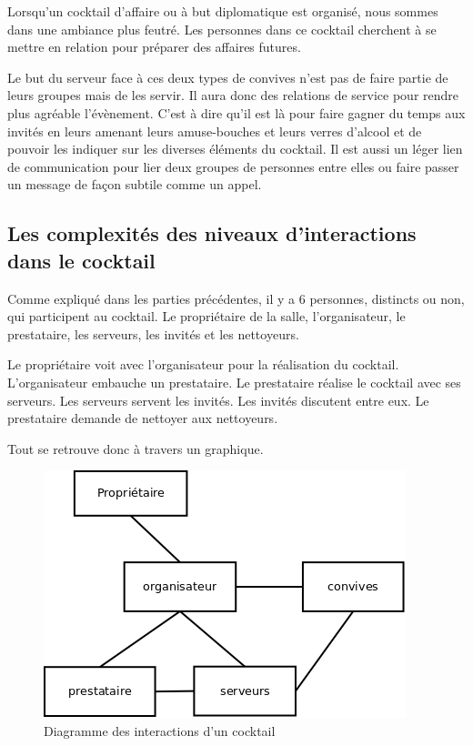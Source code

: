 Lorsqu’un cocktail d’affaire ou à but diplomatique est organisé, nous sommes dans une ambiance plus feutré.  Les personnes dans ce cocktail cherchent à se mettre en relation pour préparer des affaires futures.

Le but du serveur face à ces deux types de convives n’est pas de faire partie de leurs groupes mais de les servir. Il aura donc des relations de service pour rendre plus agréable l’évènement. C’est à dire qu’il est là pour faire gagner du temps aux invités en leurs amenant leurs amuse-bouches et leurs verres d’alcool et de pouvoir les indiquer sur les diverses éléments du cocktail. Il est aussi un léger lien de communication pour lier deux groupes de personnes entre elles ou faire passer un message de façon subtile comme un appel. 


\subsection{Les complexités des niveaux d'interactions dans le cocktail}

Comme expliqué dans les parties précédentes, il y a 6 personnes, distincts ou non, qui participent au cocktail. Le propriétaire de la salle, l’organisateur, le prestataire, les serveurs, les invités et les nettoyeurs.

Le propriétaire voit avec l’organisateur pour la réalisation du cocktail. L’organisateur embauche un prestataire. Le prestataire réalise le cocktail avec ses serveurs. Les serveurs servent les invités. Les invités discutent entre eux. Le prestataire demande de nettoyer aux nettoyeurs.

Tout se retrouve donc à travers un graphique.

\begin{figure}[h]
\begin{center}
\includegraphics[scale=0.55]{Images/interaction_cocktail.png}
\caption{Diagramme des interactions d'un cocktail}
\label{Diagramme des interactions d'un cocktail}
\end{center}
\end{figure}


